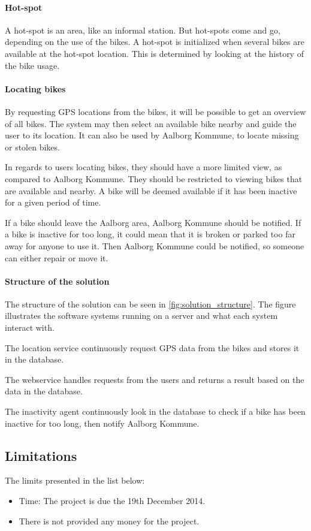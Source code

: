 \paragraph{Hot-spot}
A hot-spot is an area, like an informal station.
But hot-spots come and go, depending on the use of the bikes.
A hot-spot is initialized when several bikes are available at the hot-spot location.
This is determined by looking at the history of the bike usage.

\paragraph{Locating bikes}
By requesting GPS locations from the bikes, it will be possible to get an overview of all bikes.
The system may then select an available bike nearby and guide the user to its location.
It can also be used by Aalborg Kommune, to locate missing or stolen bikes.

In regards to users locating bikes, they should have a more limited view, as compared to Aalborg Kommune.
They should be restricted to viewing bikes that are available and nearby.
A bike will be deemed available if it has been inactive for a given period of time.

If a bike should leave the Aalborg area, Aalborg Kommune should be notified.
If a bike is inactive for too long, it could mean that it is broken or parked too far away for anyone to use it.
Then Aalborg Kommune could be notified, so someone can either repair or move it.

\paragraph{Structure of the solution}
The structure of the solution can be seen in \cref{fig:solution_structure}.
The figure illustrates the software systems running on a server and what each system interact with.

The location service continuously request GPS data from the bikes and stores it in the database.

The webservice handles requests from the users and returns a result based on the data in the database.

The inactivity agent continuously look in the database to check if a bike has been inactive for too long, then notify Aalborg Kommune.

\subsection{Limitations}
The limits presented in the list below:
\begin{itemize}
\item Time: The project is due the 19th December 2014.
\item There is not provided any money for the project.
\end{itemize}

